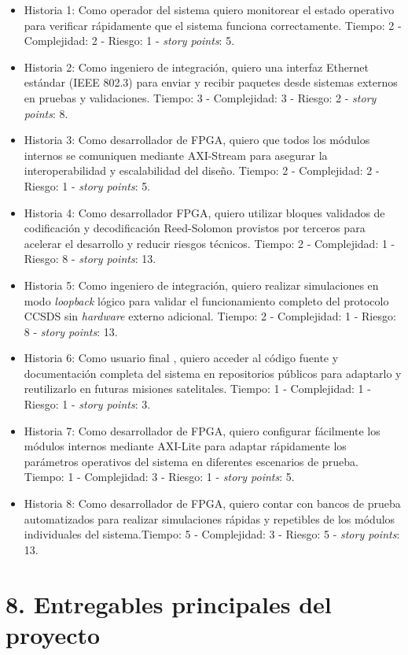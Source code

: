 \documentclass[
11pt, %
]{charter}
\begin{document}
\begin{itemize}
\item Historia 1: Como operador del sistema quiero monitorear el estado operativo para verificar rápidamente que el sistema funciona correctamente. Tiempo: 2 - Complejidad: 2 - Riesgo: 1 - \textit{story points}: 5.
\item Historia 2: Como ingeniero de integración, quiero una interfaz Ethernet estándar (IEEE 802.3) para enviar y recibir paquetes desde sistemas externos en pruebas y validaciones. Tiempo: 3 - Complejidad: 3 - Riesgo: 2 - \textit{story points}: 8.
\item Historia 3: Como desarrollador de FPGA, quiero que todos los módulos internos se comuniquen mediante AXI-Stream para asegurar la interoperabilidad y escalabilidad del diseño. Tiempo: 2 - Complejidad: 2 - Riesgo: 1 - \textit{story points}: 5.
\item Historia 4: Como desarrollador FPGA, quiero utilizar bloques validados de codificación y decodificación Reed-Solomon provistos por terceros para acelerar el desarrollo y reducir riesgos técnicos. Tiempo: 2 - Complejidad: 1 - Riesgo: 8 - \textit{story points}: 13.
\item Historia 5: Como ingeniero de integración, quiero realizar simulaciones en modo \textit{loopback} lógico para validar el funcionamiento completo del protocolo CCSDS sin \textit{hardware} externo adicional. Tiempo: 2 - Complejidad: 1 - Riesgo: 8 - \textit{story points}: 13.
\item Historia 6: Como usuario final , quiero acceder al código fuente y documentación completa del sistema en repositorios públicos para adaptarlo y reutilizarlo en futuras misiones satelitales. Tiempo: 1 - Complejidad: 1 - Riesgo: 1 - \textit{story points}: 3.
\item Historia 7: Como desarrollador de FPGA, quiero configurar fácilmente los módulos internos mediante AXI-Lite para adaptar rápidamente los parámetros operativos del sistema en diferentes escenarios de prueba. Tiempo: 1 - Complejidad: 3 - Riesgo: 1 - \textit{story points}: 5.
\item Historia 8: Como desarrollador de FPGA, quiero contar con bancos de prueba automatizados para realizar simulaciones rápidas y repetibles de los módulos individuales del sistema.Tiempo: 5 - Complejidad: 3 - Riesgo: 5 - \textit{story points}: 13.
\end{itemize}


\section{8. Entregables principales del proyecto}
\label{sec:entregables}
\end{document}
